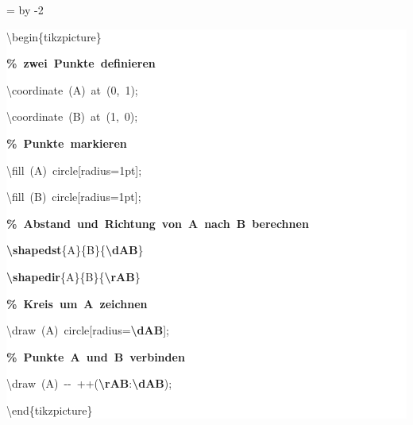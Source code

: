 \begingroup
\ttfamily
{}
=\textwidth
\advance{} by -2\fboxsep
\noindent
\colorbox{background}
{%
\parbox{\dimen255}
{%
\rule[-0.5ex]{0pt}{2.5ex}\hspace*{0.0em}\textbackslash{}begin\{tikzpicture\}\\
\rule[-0.5ex]{0pt}{2.5ex}\hspace*{1.0em}\textcolor{G}{\textbf{\%~zwei~Punkte~definieren}}\\
\rule[-0.5ex]{0pt}{2.5ex}\hspace*{1.0em}\textbackslash{}coordinate~(A)~at~(0,~1);\\
\rule[-0.5ex]{0pt}{2.5ex}\hspace*{1.0em}\textbackslash{}coordinate~(B)~at~(1,~0);\\
\rule[-0.5ex]{0pt}{2.5ex}\hspace*{1.0em}\textcolor{G}{\textbf{\%~Punkte~markieren}}\\
\rule[-0.5ex]{0pt}{2.5ex}\hspace*{1.0em}\textbackslash{}fill~(A)~circle[radius=1pt];\\
\rule[-0.5ex]{0pt}{2.5ex}\hspace*{1.0em}\textbackslash{}fill~(B)~circle[radius=1pt];\\
\rule[-0.5ex]{0pt}{2.5ex}\hspace*{1.0em}\textcolor{G}{\textbf{\%~Abstand~und~Richtung~von~A~nach~B~berechnen}}\\
\rule[-0.5ex]{0pt}{2.5ex}\hspace*{1.0em}\textcolor{R}{\textbf{\textbackslash{}shapedst}}\{A\}\{B\}\{\textcolor{B}{\textbf{\textbackslash{}dAB}}\}\\
\rule[-0.5ex]{0pt}{2.5ex}\hspace*{1.0em}\textcolor{R}{\textbf{\textbackslash{}shapedir}}\{A\}\{B\}\{\textcolor{B}{\textbf{\textbackslash{}rAB}}\}\\
\rule[-0.5ex]{0pt}{2.5ex}\hspace*{1.0em}\textcolor{G}{\textbf{\%~Kreis~um~A~zeichnen}}\\
\rule[-0.5ex]{0pt}{2.5ex}\hspace*{1.0em}\textbackslash{}draw~(A)~circle[radius=\textcolor{B}{\textbf{\textbackslash{}dAB}}];\\
\rule[-0.5ex]{0pt}{2.5ex}\hspace*{1.0em}\textcolor{G}{\textbf{\%~Punkte~A~und~B~verbinden}}\\
\rule[-0.5ex]{0pt}{2.5ex}\hspace*{1.0em}\textbackslash{}draw~(A)~{-}{-}~++(\textcolor{B}{\textbf{\textbackslash{}rAB}}:\textcolor{B}{\textbf{\textbackslash{}dAB}});\\
\rule[-0.5ex]{0pt}{2.5ex}\hspace*{0.0em}\textbackslash{}end\{tikzpicture\}}%
}%
\endgroup
